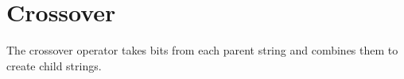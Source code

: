 \documentclass{report}
\begin{document}
\section{Crossover}\label{sec:crossover}

\begin{sloppypar}
The crossover operator takes bits from each parent string and
combines them to create child strings.  
%
%
%
%

\end{sloppypar}
\end{document}
